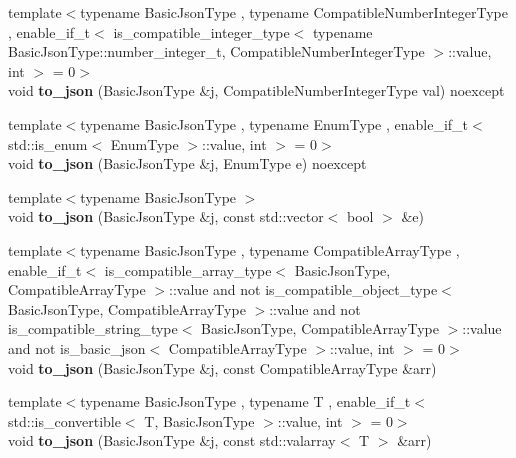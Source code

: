 \begin{DoxyCompactItemize}
\item 
\mbox{\label{namespacenlohmann_1_1detail_a91fe576be579c8c2fdd14610605c6dd2}} 
{\footnotesize template$<$typename Basic\+Json\+Type , typename Compatible\+Number\+Integer\+Type , enable\+\_\+if\+\_\+t$<$ is\+\_\+compatible\+\_\+integer\+\_\+type$<$ typename Basic\+Json\+Type\+::number\+\_\+integer\+\_\+t, Compatible\+Number\+Integer\+Type $>$\+::value, int $>$  = 0$>$ }\\void {\bfseries to\+\_\+json} (Basic\+Json\+Type \&j, Compatible\+Number\+Integer\+Type val) noexcept
\item 
\mbox{\label{namespacenlohmann_1_1detail_a0c8b159dba71981d6c555d284cf6e2bf}} 
{\footnotesize template$<$typename Basic\+Json\+Type , typename Enum\+Type , enable\+\_\+if\+\_\+t$<$ std\+::is\+\_\+enum$<$ Enum\+Type $>$\+::value, int $>$  = 0$>$ }\\void {\bfseries to\+\_\+json} (Basic\+Json\+Type \&j, Enum\+Type e) noexcept
\item 
\mbox{\label{namespacenlohmann_1_1detail_aeca6fb5fede5ed1e12a4420d98a5692b}} 
{\footnotesize template$<$typename Basic\+Json\+Type $>$ }\\void {\bfseries to\+\_\+json} (Basic\+Json\+Type \&j, const std\+::vector$<$ bool $>$ \&e)
\item 
\mbox{\label{namespacenlohmann_1_1detail_a3afebc132c5ff83f9cd160e52030fdfd}} 
{\footnotesize template$<$typename Basic\+Json\+Type , typename Compatible\+Array\+Type , enable\+\_\+if\+\_\+t$<$ is\+\_\+compatible\+\_\+array\+\_\+type$<$ Basic\+Json\+Type, Compatible\+Array\+Type $>$\+::value and not is\+\_\+compatible\+\_\+object\+\_\+type$<$ Basic\+Json\+Type, Compatible\+Array\+Type $>$\+::value and not is\+\_\+compatible\+\_\+string\+\_\+type$<$ Basic\+Json\+Type, Compatible\+Array\+Type $>$\+::value and not is\+\_\+basic\+\_\+json$<$ Compatible\+Array\+Type $>$\+::value, int $>$  = 0$>$ }\\void {\bfseries to\+\_\+json} (Basic\+Json\+Type \&j, const Compatible\+Array\+Type \&arr)
\item 
\mbox{\label{namespacenlohmann_1_1detail_a7f7c7b9760161b774cdc0b4b838fae64}} 
{\footnotesize template$<$typename Basic\+Json\+Type , typename T , enable\+\_\+if\+\_\+t$<$ std\+::is\+\_\+convertible$<$ T, Basic\+Json\+Type $>$\+::value, int $>$  = 0$>$ }\\void {\bfseries to\+\_\+json} (Basic\+Json\+Type \&j, const std\+::valarray$<$ T $>$ \&arr)

\end{DoxyCompactItemize}
